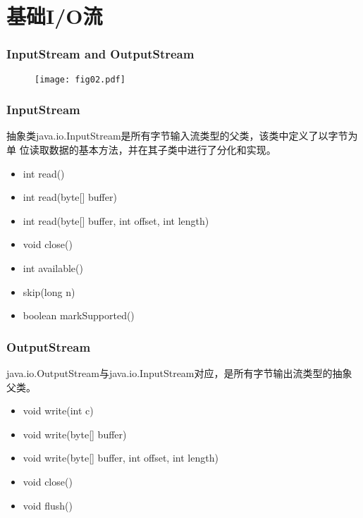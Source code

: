 \section{基础I/O流}

\begin{frame}[fragile] %
\frametitle{InputStream and OutputStream}

\begin{figure}
\centering
\texttt{[image: fig02.pdf]}
\end{figure}
\end{frame}

\begin{frame}[fragile] %
\frametitle{InputStream}

抽象类java.io.InputStream是所有字节输入流类型的父类，该类中定义了以字节为单
位读取数据的基本方法，并在其子类中进行了分化和实现。

\begin{itemize}
\item int read()
\item int read(byte[] buffer)
\item int read(byte[] buffer, int offset, int length)
\end{itemize}
\begin{itemize}
\item void close()
\item int available()
\item skip(long n)
\item boolean markSupported()
\end{itemize}
\end{frame}

\begin{frame}[fragile] %
\frametitle{OutputStream}

java.io.OutputStream与java.io.InputStream对应，是所有字节输出流类型的抽象父类。

\begin{itemize}
\item void write(int c)
\item void write(byte[] buffer)
\item void write(byte[] buffer, int offset, int length)
\end{itemize}
\begin{itemize}
\item void close()
\item void flush()
\end{itemize}
\end{frame}

